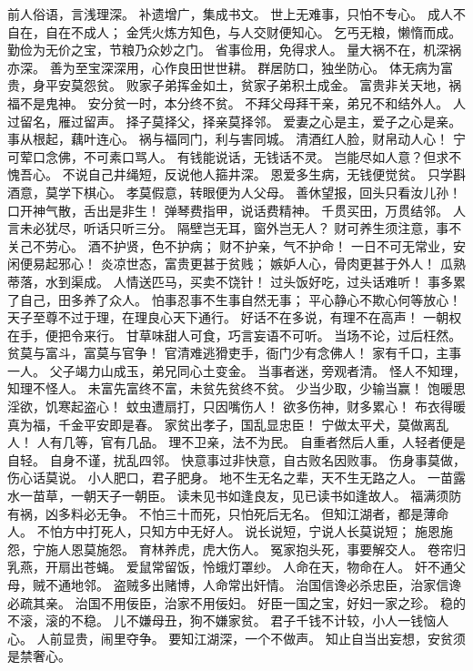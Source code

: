 \documentclass[12pt,UTF8]{ctexbook}
\begin{document}
前人俗语，言浅理深。
补遗增广，集成书文。
世上无难事，只怕不专心。
成人不自在，自在不成人；
金凭火炼方知色，与人交财便知心。
乞丐无粮，懒惰而成。
勤俭为无价之宝，节粮乃众妙之门。
省事俭用，免得求人。
量大祸不在，机深祸亦深。
善为至宝深深用，心作良田世世耕。
群居防口，独坐防心。
体无病为富贵，身平安莫怨贫。
败家子弟挥金如土，贫家子弟积土成金。
富贵非关天地，祸福不是鬼神。
安分贫一时，本分终不贫。
不拜父母拜干亲，弟兄不和结外人。
人过留名，雁过留声。
择子莫择父，择亲莫择邻。
爱妻之心是主，爱子之心是亲。
事从根起，藕叶连心。
祸与福同门，利与害同城。
清酒红人脸，财帛动人心！
宁可荤口念佛，不可素口骂人。
有钱能说话，无钱话不灵。
岂能尽如人意？但求不愧吾心。
不说自己井绳短，反说他人箍井深。
恩爱多生病，无钱便觉贫。
只学斟酒意，莫学下棋心。
孝莫假意，转眼便为人父母。
善休望报，回头只看汝儿孙！
口开神气散，舌出是非生！
弹琴费指甲，说话费精神。
千贯买田，万贯结邻。
人言未必犹尽，听话只听三分。
隔壁岂无耳，窗外岂无人？
财可养生须注意，事不关己不劳心。
酒不护贤，色不护病；
财不护亲，气不护命！
一日不可无常业，安闲便易起邪心！
炎凉世态，富贵更甚于贫贱；
嫉妒人心，骨肉更甚于外人！
瓜熟蒂落，水到渠成。
人情送匹马，买卖不饶针！
过头饭好吃，过头话难听！
事多累了自己，田多养了众人。
怕事忍事不生事自然无事；
平心静心不欺心何等放心！
天子至尊不过于理，在理良心天下通行。
好话不在多说，有理不在高声！
一朝权在手，便把令来行。
甘草味甜人可食，巧言妄语不可听。
当场不论，过后枉然。
贫莫与富斗，富莫与官争！
官清难逃猾吏手，衙门少有念佛人！
家有千口，主事一人。
父子竭力山成玉，弟兄同心土变金。
当事者迷，旁观者清。
怪人不知理，知理不怪人。
未富先富终不富，未贫先贫终不贫。
少当少取，少输当赢！
饱暖思淫欲，饥寒起盗心！
蚊虫遭扇打，只因嘴伤人！
欲多伤神，财多累心！
布衣得暖真为福，千金平安即是春。
家贫出孝子，国乱显忠臣！
宁做太平犬，莫做离乱人！
人有几等，官有几品。
理不卫亲，法不为民。
自重者然后人重，人轻者便是自轻。
自身不谨，扰乱四邻。
快意事过非快意，自古败名因败事。
伤身事莫做，伤心话莫说。
小人肥口，君子肥身。
地不生无名之辈，天不生无路之人。
一苗露水一苗草，一朝天子一朝臣。
读未见书如逢良友，见已读书如逢故人。
福满须防有祸，凶多料必无争。
不怕三十而死，只怕死后无名。
但知江湖者，都是薄命人。
不怕方中打死人，只知方中无好人。
说长说短，宁说人长莫说短；
施恩施怨，宁施人恩莫施怨。
育林养虎，虎大伤人。
冤家抱头死，事要解交人。
卷帘归乳燕，开扇出苍蝇。
爱鼠常留饭，怜蛾灯罩纱。
人命在天，物命在人。
奸不通父母，贼不通地邻。
盗贼多出赌博，人命常出奸情。
治国信谗必杀忠臣，治家信谗必疏其亲。
治国不用佞臣，治家不用佞妇。
好臣一国之宝，好妇一家之珍。
稳的不滚，滚的不稳。
儿不嫌母丑，狗不嫌家贫。
君子千钱不计较，小人一钱恼人心。
人前显贵，闹里夺争。
要知江湖深，一个不做声。
知止自当出妄想，安贫须是禁奢心。
\end{document}
